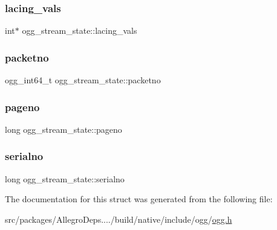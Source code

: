 \subsubsection{\texorpdfstring{lacing\+\_\+vals}{lacing\_vals}}
{\footnotesize\ttfamily int$\ast$ ogg\+\_\+stream\+\_\+state\+::lacing\+\_\+vals}

\mbox{\label{structogg__stream__state_a1bebf380025b6ca0841497e7ab2b5c34}} 
\subsubsection{\texorpdfstring{packetno}{packetno}}
{\footnotesize\ttfamily ogg\+\_\+int64\+\_\+t ogg\+\_\+stream\+\_\+state\+::packetno}

\mbox{\label{structogg__stream__state_a0ad3315203fcebdc2ccd3b050d28a65c}} 
\subsubsection{\texorpdfstring{pageno}{pageno}}
{\footnotesize\ttfamily long ogg\+\_\+stream\+\_\+state\+::pageno}

\mbox{\label{structogg__stream__state_a79248e3f1f41cde5331909e8edd98e10}} 
\subsubsection{\texorpdfstring{serialno}{serialno}}
{\footnotesize\ttfamily long ogg\+\_\+stream\+\_\+state\+::serialno}



The documentation for this struct was generated from the following file\+:\begin{DoxyCompactItemize}
\item 
src/packages/\+Allegro\+Deps..../build/native/include/ogg/\hyperlink{ogg_8h}{ogg.\+h}\end{DoxyCompactItemize}
